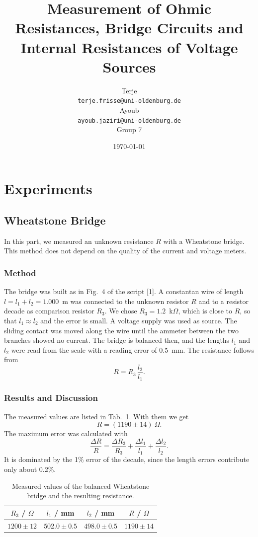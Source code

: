 \documentclass[12pt,a4paper]{article}
\title{Measurement of Ohmic Resistances, Bridge Circuits
and Internal Resistances of Voltage Sources}
\author{
Terje\\
\texttt{terje.frisse@uni-oldenburg.de}\\
Ayoub\\
\texttt{ayoub.jaziri@uni-oldenburg.de}\\
Group 7
}
\date{\today}
\begin{document}
\maketitle
\section{Experiments}
\subsection{Wheatstone Bridge}
In this part, we measured an unknown resistance $R$ with a Wheatstone bridge. This method does not depend on the quality of the current and voltage meters.

\subsubsection{Method}
The bridge was built as in Fig.~4 of the script [1]. A constantan wire of length $l = l_1 + l_2 = 1.000$~m was connected to the unknown resistor $R$ and to a resistor decade as comparison resistor $R_3$. We chose $R_3 = 1.2$~k$\Omega$, which is close to $R$, so that $l_1 \approx l_2$ and the error is small. A voltage supply was used as source. The sliding contact was moved along the wire until the ammeter between the two branches showed no current. The bridge is balanced then, and the lengths $l_1$ and $l_2$ were read from the scale with a reading error of 0.5~mm. The resistance follows from
\begin{equation}
  R = R_3 \,\frac{l_2}{l_1}.
\end{equation}

\subsubsection{Results and Discussion}
The measured values are listed in Tab.~\ref{tab:wheat}. With them we get
\begin{equation}
  R = (1190 \pm 14)~\Omega.
\end{equation}
The maximum error was calculated with
\begin{equation}
  \frac{\Delta R}{R} = \frac{\Delta R_3}{R_3} + \frac{\Delta l_1}{l_1} + \frac{\Delta l_2}{l_2}.
\end{equation}
It is dominated by the 1\% error of the decade, since the length errors contribute only about 0.2\%.

\begin{table}[H]
  \centering
  \caption{Measured values of the balanced Wheatstone bridge and the resulting resistance.}
  \label{tab:wheat}
  \begin{tabular}{cccc}
    \hline
    $R_3$ / $\Omega$ & $l_1$ / mm & $l_2$ / mm & $R$ / $\Omega$ \\
    \hline
    $1200 \pm 12$ & $502.0 \pm 0.5$ & $498.0 \pm 0.5$ & $1190 \pm 14$ \\
    \hline
  \end{tabular}
\end{table}
\end{document}
